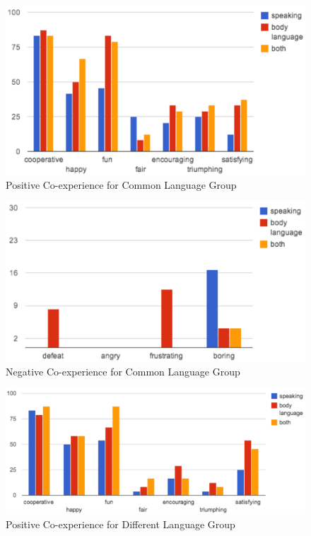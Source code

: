 \begin{figure}[!h]
\centering
\includegraphics[width=0.9\columnwidth]{Figures/US_Co-ex_Com_Pos.png}
\caption{Positive Co-experience for Common Language Group}
\label{fig:US_Co-ex_Com_Pos}
\end{figure}

\begin{figure}[!h]
\centering
\includegraphics[width=0.9\columnwidth]{Figures/US_Co-ex_Com_Neg.png}
\caption{Negative Co-experience for Common Language Group}
\label{fig:US_Co-ex_Com_Neg}
\end{figure}

\begin{figure}[!h]
\centering
\includegraphics[width=0.9\columnwidth]{Figures/US_Co-ex_Dif_Pos.png}
\caption{Positive Co-experience for Different Language Group}
\label{fig:US_Co-ex_Dif_Pos}
\end{figure}

